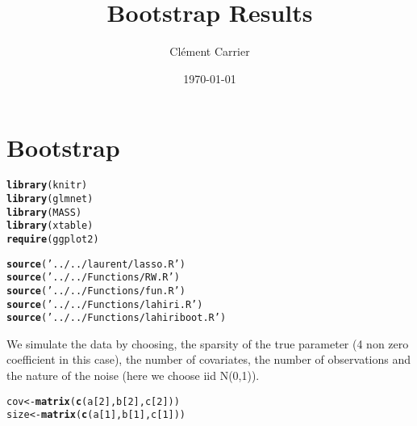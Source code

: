 \documentclass[11pt,oneside, a4paper]{amsart}\usepackage[]{graphicx}\usepackage[]{color}
\makeatletter
\newcommand{\hlnum}[1]{\textcolor[rgb]{0.686,0.059,0.569}{#1}}%
\newcommand{\hlstr}[1]{\textcolor[rgb]{0.192,0.494,0.8}{#1}}%
\newcommand{\hlstd}[1]{\textcolor[rgb]{0.345,0.345,0.345}{#1}}%
\newcommand{\hlkwb}[1]{\textcolor[rgb]{0.69,0.353,0.396}{#1}}%
\newcommand{\hlkwd}[1]{\textcolor[rgb]{0.737,0.353,0.396}{\textbf{#1}}}%
\newenvironment{kframe}{%
 \def\at@end@of@kframe{}%
 \ifinner\ifhmode%
  \def\at@end@of@kframe{\end{minipage}}%
  \begin{minipage}{\columnwidth}%
 \fi\fi%
 \def\FrameCommand##1{\hskip\@totalleftmargin \hskip-\fboxsep
 \colorbox{shadecolor}{##1}\hskip-\fboxsep
     \hskip-\linewidth \hskip-\@totalleftmargin \hskip\columnwidth}%
 \MakeFramed {\advance\hsize-\width
   \@totalleftmargin\z@ \linewidth\hsize
   \@setminipage}}%
 {\par\unskip\endMakeFramed%
 \at@end@of@kframe}
\newenvironment{knitrout}{}{} %
\makeatother
\begin{document}
  
\title{Bootstrap Results}   
\author{Clément Carrier}
\date{\today}
\maketitle


\section*{Bootstrap}


\begin{knitrout}
\color{fgcolor}\begin{kframe}
\begin{alltt}
\hlkwd{library}\hlstd{(knitr)}
\hlkwd{library}\hlstd{(glmnet)}
\hlkwd{library}\hlstd{(MASS)}
\hlkwd{library}\hlstd{(xtable)}
\hlkwd{require}\hlstd{(ggplot2)}
\end{alltt}
\end{kframe}
\end{knitrout}




\begin{knitrout}
\color{fgcolor}\begin{kframe}
\begin{alltt}
\hlkwd{source}\hlstd{(}\hlstr{'../../laurent/lasso.R'}\hlstd{)}
\hlkwd{source}\hlstd{(}\hlstr{'../../Functions/RW.R'}\hlstd{)}
\hlkwd{source}\hlstd{(}\hlstr{'../../Functions/fun.R'}\hlstd{)}
\hlkwd{source}\hlstd{(}\hlstr{'../../Functions/lahiri.R'}\hlstd{)}
\hlkwd{source}\hlstd{(}\hlstr{'../../Functions/lahiriboot.R'}\hlstd{)}
\end{alltt}
\end{kframe}
\end{knitrout}


We simulate the data by choosing, the sparsity of the true parameter (4 non zero coefficient in this case), the number of covariates, the number of observations and the nature of the noise (here we choose iid N(0,1)). 









\begin{knitrout}
\color{fgcolor}\begin{kframe}
\begin{alltt}
\hlstd{cov}\hlkwb{<-}\hlkwd{matrix}\hlstd{(}\hlkwd{c}\hlstd{(a[}\hlnum{2}\hlstd{],b[}\hlnum{2}\hlstd{],c[}\hlnum{2}\hlstd{]))}
\hlstd{size}\hlkwb{<-}\hlkwd{matrix}\hlstd{(}\hlkwd{c}\hlstd{(a[}\hlnum{1}\hlstd{],b[}\hlnum{1}\hlstd{],c[}\hlnum{1}\hlstd{]))}
\end{alltt}
\end{kframe}
\end{knitrout}
\end{document}
